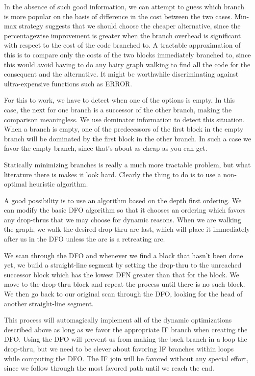 In the absence of such good information, we can attempt to guess which branch
is more popular on the basis of difference in the cost between the two cases.
Min-max strategy suggests that we should choose the cheaper alternative, since
the percentagewise improvement is greater when the branch overhead is
significant with respect to the cost of the code branched to.  A tractable
approximation of this is to compare only the costs of the two blocks
immediately branched to, since this would avoid having to do any hairy graph
walking to find all the code for the consequent and the alternative.  It might
be worthwhile discriminating against ultra-expensive functions such as ERROR.

For this to work, we have to detect when one of the options is empty.  In this
case, the next for one branch is a successor of the other branch, making the
comparison meaningless.  We use dominator information to detect this situation.
When a branch is empty, one of the predecessors of the first block in the empty
branch will be dominated by the first block in the other branch.  In such a
case we favor the empty branch, since that's about as cheap as you can get.

Statically minimizing branches is really a much more tractable problem, but
what literature there is makes it look hard.  Clearly the thing to do is to use
a non-optimal heuristic algorithm.

A good possibility is to use an algorithm based on the depth first ordering.
We can modify the basic DFO algorithm so that it chooses an ordering which
favors any drop-thrus that we may choose for dynamic reasons.  When we are
walking the graph, we walk the desired drop-thru arc last, which will place it
immediately after us in the DFO unless the arc is a retreating arc.

We scan through the DFO and whenever we find a block that hasn't been done yet,
we build a straight-line segment by setting the drop-thru to the unreached
successor block which has the lowest DFN greater than that for the block.  We
move to the drop-thru block and repeat the process until there is no such
block.  We then go back to our original scan through the DFO, looking for the
head of another straight-line segment.

This process will automagically implement all of the dynamic optimizations
described above as long as we favor the appropriate IF branch when creating the
DFO.  Using the DFO will prevent us from making the back branch in a loop the
drop-thru, but we need to be clever about favoring IF branches within loops
while computing the DFO.  The IF join will be favored without any special
effort, since we follow through the most favored path until we reach the end.

